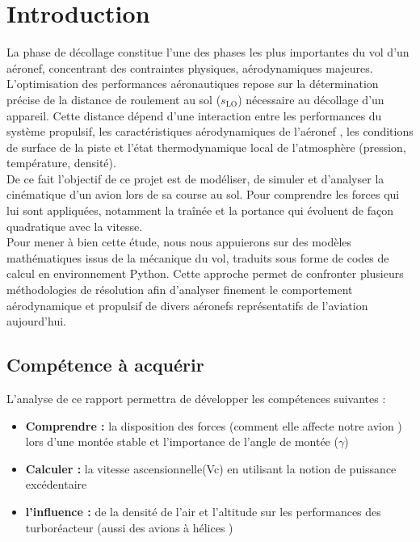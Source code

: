 
\chapter{Introduction}

La phase de décollage constitue l'une des phases les plus importantes du vol d'un aéronef, concentrant des contraintes physiques, aérodynamiques majeures. \\

L'optimisation des performances aéronautiques repose sur la détermination précise de la distance de roulement au sol ($s_{\text{LO}}$) nécessaire au décollage d'un appareil. Cette distance dépend d'une interaction  entre les performances du système propulsif, les caractéristiques aérodynamiques de l'aéronef , les conditions de surface de la piste et l'état thermodynamique local de l'atmosphère (pression, température, densité). \\

De ce fait l'objectif de ce projet est de modéliser, de simuler et d'analyser la cinématique d'un avion lors de sa course au sol. Pour comprendre les forces qui lui sont appliquées, notamment la traînée et la portance qui évoluent de façon quadratique avec la vitesse. \\

Pour mener à bien cette étude, nous nous appuierons sur des modèles mathématiques  issus de la mécanique du vol, traduits sous forme de codes de calcul en environnement Python. Cette approche permet de confronter plusieurs méthodologies de résolution afin d'analyser finement le comportement aérodynamique et propulsif de divers aéronefs représentatifs de l'aviation aujourd'hui.


\vspace{1cm}
%



\section{Compétence à acquérir}
L'analyse de ce rapport permettra de développer les compétences suivantes :
\begin{itemize}[itemsep=0pt]
	\item \textbf{Comprendre :} la disposition des forces (comment elle affecte notre avion ) lors d'une montée stable et l'importance de l'angle de montée ($\gamma$)
	\item \textbf{Calculer  :} la vitesse ascensionnelle(Vc) en utilisant la notion de puissance excédentaire
	\item \textbf{l'influence :} de la densité de l'air et l'altitude sur les performances des turboréacteur (aussi des avions à hélices )

\end{itemize}


